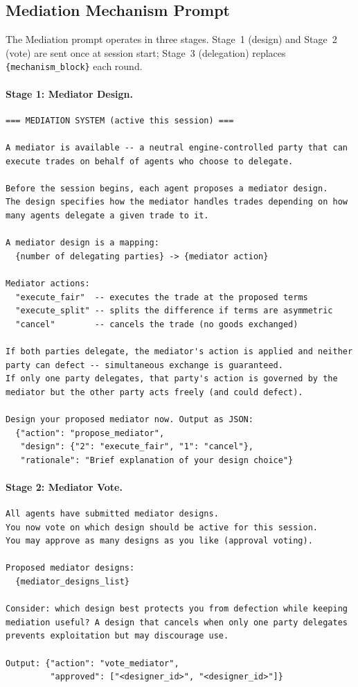 \documentclass{article}
\begin{document}
\subsection{Mediation Mechanism Prompt}
\label{app:mediation_prompt}

The Mediation prompt operates in three stages. Stage~1 (design) and Stage~2 (vote) are sent once at session start; Stage~3 (delegation) replaces \texttt{\{mechanism\_block\}} each round.

\paragraph{Stage 1: Mediator Design.}
\begin{small}
\begin{verbatim}
=== MEDIATION SYSTEM (active this session) ===

A mediator is available -- a neutral engine-controlled party that can
execute trades on behalf of agents who choose to delegate.

Before the session begins, each agent proposes a mediator design.
The design specifies how the mediator handles trades depending on how
many agents delegate a given trade to it.

A mediator design is a mapping:
  {number of delegating parties} -> {mediator action}

Mediator actions:
  "execute_fair"  -- executes the trade at the proposed terms
  "execute_split" -- splits the difference if terms are asymmetric
  "cancel"        -- cancels the trade (no goods exchanged)

If both parties delegate, the mediator's action is applied and neither
party can defect -- simultaneous exchange is guaranteed.
If only one party delegates, that party's action is governed by the
mediator but the other party acts freely (and could defect).

Design your proposed mediator now. Output as JSON:
  {"action": "propose_mediator",
   "design": {"2": "execute_fair", "1": "cancel"},
   "rationale": "Brief explanation of your design choice"}
\end{verbatim}
\end{small}

\paragraph{Stage 2: Mediator Vote.}
\begin{small}
\begin{verbatim}
All agents have submitted mediator designs.
You now vote on which design should be active for this session.
You may approve as many designs as you like (approval voting).

Proposed mediator designs:
  {mediator_designs_list}

Consider: which design best protects you from defection while keeping
mediation useful? A design that cancels when only one party delegates
prevents exploitation but may discourage use.

Output: {"action": "vote_mediator",
         "approved": ["<designer_id>", "<designer_id>"]}
\end{verbatim}
\end{small}
\end{document}
